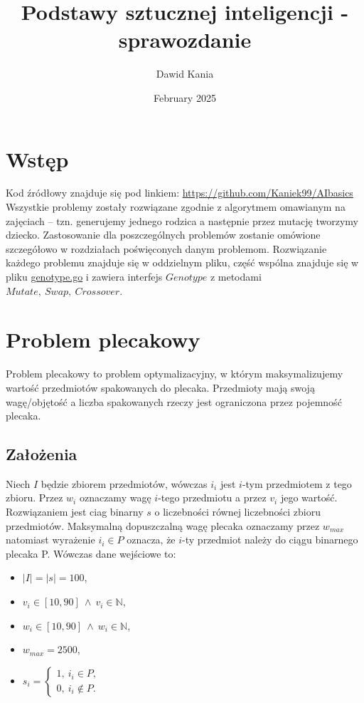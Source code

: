 \documentclass{article}
\title{Podstawy sztucznej inteligencji - sprawozdanie}
\author{Dawid Kania}
\date{February 2025}
\begin{document}
\maketitle
\newpage
\section{Wstęp}
Kod źródłowy znajduje się pod linkiem: \url{https://github.com/Kaniek99/AIbasics}\\
Wszystkie problemy zostały rozwiązane zgodnie z algorytmem omawianym na zajęciach -- tzn. generujemy jednego rodzica a następnie przez mutację tworzymy dziecko. Zastosowanie dla poszczególnych problemów zostanie omówione szczegółowo w rozdziałach poświęconych danym problemom. Rozwiązanie każdego problemu znajduje się w oddzielnym pliku, część wspólna znajduje się w pliku \href{https://github.com/Kaniek99/AIbasics/blob/main/src/genotype/genotype.go}{genotype.go} i zawiera interfejs $Genotype$ z metodami $Mutate,\ Swap,\ Crossover$.
\section{Problem plecakowy}
Problem plecakowy to problem optymalizacyjny, w którym maksymalizujemy wartość przedmiotów spakowanych do plecaka. Przedmioty mają swoją wagę/objętość a liczba spakowanych rzeczy jest ograniczona przez pojemność plecaka.
    \subsection{Założenia}
    Niech $I$ będzie zbiorem przedmiotów, wówczas $i_i$ jest $i$-tym przedmiotem z tego zbioru. Przez $w_i$ oznaczamy wagę $i$-tego przedmiotu a przez $v_i$ jego wartość. Rozwiązaniem jest ciag binarny $s$ o liczebności równej liczebności zbioru przedmiotów. Maksymalną dopuszczalną wagę plecaka oznaczamy przez $w_{max}$ natomiast wyrażenie $i_i\in P$ oznacza, że $i$-ty przedmiot należy do ciągu binarnego plecaka P. Wówczas dane wejściowe to:
    \begin{itemize}
    \item $|I| = |s| = 100$,
    \item $v_i\in[10,90]\ \wedge\ v_i\in\mathbb{N} $,
    \item $w_i\in[10,90]\ \wedge\ w_i\in\mathbb{N} $,
    \item $w_{max} = 2500$,
    \item $s_i=\left\{\begin{array}{l}
        1,\ i_i\in P, \\
        0,\ i_i\not\in P.
        \end{array}\right.$
    \end{itemize}
\end{document}
